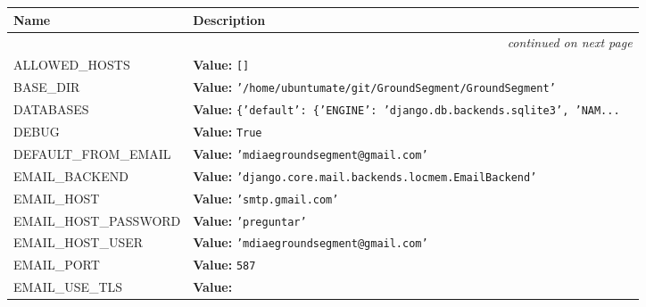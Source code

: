     \vspace{-1cm}
\hspace{\varindent}\begin{longtable}{|p{\varnamewidth}|p{\vardescrwidth}|l}
\cline{1-2}
\cline{1-2} \centering \textbf{Name} & \centering \textbf{Description}& \\
\cline{1-2}
\endhead\cline{1-2}\multicolumn{3}{r}{\small\textit{continued on next page}}\\\endfoot\cline{1-2}
\endlastfoot\raggedright A\-L\-L\-O\-W\-E\-D\-\_\-H\-O\-S\-T\-S\- & \raggedright \textbf{Value:} 
{\tt \texttt{[}\texttt{]}}&\\
\cline{1-2}
\raggedright B\-A\-S\-E\-\_\-D\-I\-R\- & \raggedright \textbf{Value:} 
{\tt \texttt{'}\texttt{/home/ubuntumate/git/GroundSegment/GroundSegment}\texttt{'}}&\\
\cline{1-2}
\raggedright D\-A\-T\-A\-B\-A\-S\-E\-S\- & \raggedright \textbf{Value:} 
{\tt \texttt{\{}\texttt{'}\texttt{default}\texttt{'}\texttt{: }\texttt{\{}\texttt{'}\texttt{ENGINE}\texttt{'}\texttt{: }\texttt{'}\texttt{django.db.backends.sqlite3}\texttt{'}\texttt{, }\texttt{'}\texttt{NAM}\texttt{...}}&\\
\cline{1-2}
\raggedright D\-E\-B\-U\-G\- & \raggedright \textbf{Value:} 
{\tt True}&\\
\cline{1-2}
\raggedright D\-E\-F\-A\-U\-L\-T\-\_\-F\-R\-O\-M\-\_\-E\-M\-A\-I\-L\- & \raggedright \textbf{Value:} 
{\tt \texttt{'}\texttt{mdiaegroundsegment@gmail.com}\texttt{'}}&\\
\cline{1-2}
\raggedright E\-M\-A\-I\-L\-\_\-B\-A\-C\-K\-E\-N\-D\- & \raggedright \textbf{Value:} 
{\tt \texttt{'}\texttt{django.core.mail.backends.locmem.EmailBackend}\texttt{'}}&\\
\cline{1-2}
\raggedright E\-M\-A\-I\-L\-\_\-H\-O\-S\-T\- & \raggedright \textbf{Value:} 
{\tt \texttt{'}\texttt{smtp.gmail.com}\texttt{'}}&\\
\cline{1-2}
\raggedright E\-M\-A\-I\-L\-\_\-H\-O\-S\-T\-\_\-P\-A\-S\-S\-W\-O\-R\-D\- & \raggedright \textbf{Value:} 
{\tt \texttt{'}\texttt{preguntar}\texttt{'}}&\\
\cline{1-2}
\raggedright E\-M\-A\-I\-L\-\_\-H\-O\-S\-T\-\_\-U\-S\-E\-R\- & \raggedright \textbf{Value:} 
{\tt \texttt{'}\texttt{mdiaegroundsegment@gmail.com}\texttt{'}}&\\
\cline{1-2}
\raggedright E\-M\-A\-I\-L\-\_\-P\-O\-R\-T\- & \raggedright \textbf{Value:} 
{\tt 587}&\\
\cline{1-2}
\raggedright E\-M\-A\-I\-L\-\_\-U\-S\-E\-\_\-T\-L\-S\- & \raggedright \textbf{Value:} 

\end{longtable}
